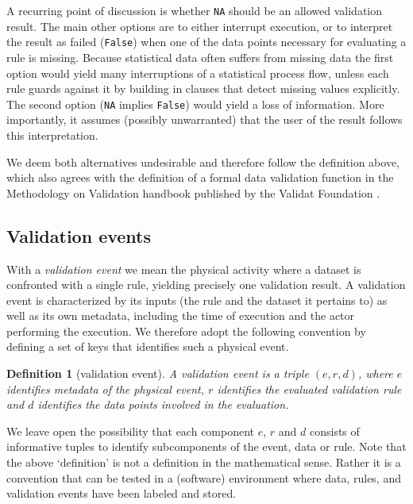 \documentclass[a4paper, 11pt]{article}
\newtheorem{definition}{Definition}
\newcommand{\onwaar}{{\normalfont \texttt{False}}}
\newcommand{\na}{{\normalfont \texttt{NA}}}
\begin{document}
A recurring point of discussion is whether \na{} should be an allowed
validation result. The main other options are to either interrupt execution, or
to interpret the result as failed (\onwaar{}) when one of the data points
necessary for evaluating a rule is missing. Because statistical data often
suffers from missing data the first option would yield many interruptions of a
statistical process flow, unless each rule guards against it by building in
clauses that detect missing values explicitly. The second option (\na{} implies
\onwaar{}) would yield a loss of information. More importantly, it assumes
(possibly unwarranted) that the user of the result follows this interpretation.

We deem both alternatives undesirable and therefore follow the definition
above, which also agrees with the definition of a formal data validation
function in the Methodology on Validation handbook published by the Validat
Foundation \cite{zio2015methodology}.

\subsection{Validation events}

With a \emph{validation event} we mean the physical activity where a dataset is
confronted with a single rule, yielding precisely one validation result. A
validation event is characterized by its inputs (the rule and the dataset it
pertains to) as well as its own metadata, including the time of execution and
the actor performing the execution. We therefore adopt the following convention
by defining a set of keys that identifies such a physical event.
%
\begin{definition}[validation event] 
A validation event is a triple $(e,r,d)$, where $e$ identifies metadata of the
physical event, $r$ identifies the evaluated validation rule and $d$ identifies
the data points involved in the evaluation.
\label{def:validaitonevent}
\end{definition}
%
We leave open the possibility that each component $e$, $r$ and $d$ consists of
informative tuples to identify subcomponents of the event, data or rule.  Note
that the above `definition' is not a definition in the mathematical sense.
Rather it is a convention that can be tested in a (software) environment where
data, rules, and validation events have been labeled and stored.

 
\end{document}
